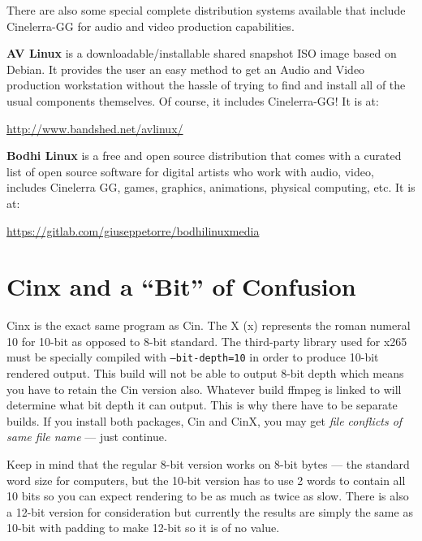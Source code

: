 There are also some special complete distribution systems available that include Cinelerra-GG for audio and video production capabilities.

\textbf{AV Linux} is a downloadable/installable shared snapshot ISO image based on Debian. 
It provides the user an easy method to get an Audio and Video production workstation without the hassle of trying to find and install all of the usual components themselves. 
Of course, it includes Cinelerra-GG!  
It is at:

\begin{center}
	{\small \url{http://www.bandshed.net/avlinux/}}
\end{center}

\textbf{Bodhi Linux} is a free and open source distribution that comes with a curated list of open source software for digital artists who work with audio, video, includes Cinelerra GG, games, graphics, animations, physical computing, etc.  
It is at:

\begin{center}
	{\small \url{https://gitlab.com/giuseppetorre/bodhilinuxmedia}}
\end{center}	

\section{Cinx and a “Bit” of Confusion}%
\label{sec:cinx_and_a_bit_of_confusion}

Cinx is the exact same program as Cin.  
The X (x) represents the roman numeral 10 for 10-bit as opposed to 8-bit standard.  
The third-party library used for x265 must be specially compiled with \texttt{--bit-depth=10} in order to produce 10-bit rendered output.  
This build will not be able to output 8-bit depth which means you have to retain the Cin version also.  
Whatever build ffmpeg is linked to will determine what bit depth it can output.  
This is why there have to be separate builds.  
If you install both packages, Cin and CinX, you may get \textit{file conflicts of same file name} --- just continue.

Keep in mind that the regular 8-bit version works on 8-bit bytes --- the standard word size for computers, but the 10-bit version has to use 2 words to contain all 10 bits so you can expect rendering to be as much as twice as slow.  
There is also a 12-bit version for consideration but currently the results are simply the same as 10-bit with padding to make 12-bit so it is of no value.

















